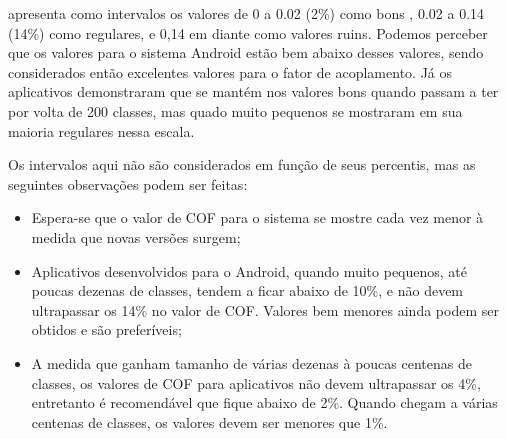  apresenta como intervalos os valores de 0 a 0.02 (2\%) como bons , 0.02 a 0.14 (14\%) como regulares, e 0,14 em diante como valores ruins. Podemos perceber que os valores para o sistema Android estão bem abaixo desses valores, sendo considerados então excelentes valores para o fator de acoplamento. Já os aplicativos demonstraram que se mantém nos valores bons quando passam a ter por volta de 200 classes, mas quado muito pequenos se mostraram em sua maioria regulares nessa escala. 

Os intervalos aqui não são considerados em função de seus percentis, mas as seguintes observações podem ser feitas:

\begin{itemize}
\item Espera-se que o valor de COF para o sistema se mostre cada vez menor à medida que novas versões surgem;
\item Aplicativos desenvolvidos para o Android, quando muito pequenos, até poucas dezenas de classes, tendem a ficar abaixo de 10\%, e não devem ultrapassar os 14\% no valor de COF. Valores bem menores ainda podem ser obtidos e são preferíveis;
\item A medida que ganham tamanho de várias dezenas à poucas centenas de classes, os valores de COF para aplicativos não devem ultrapassar os 4\%, entretanto é recomendável que fique abaixo de 2\%. Quando chegam a várias centenas de classes, os valores devem ser menores que 1\%.
\end{itemize}